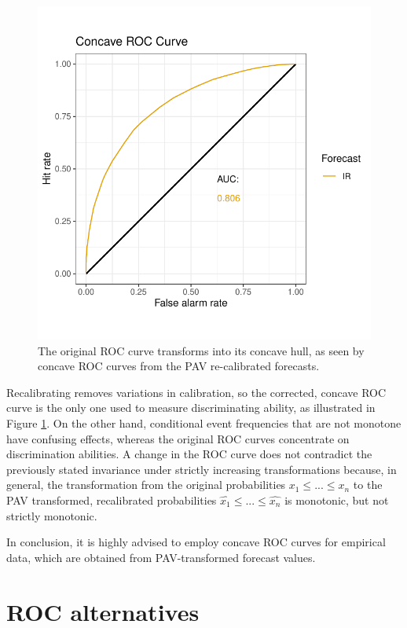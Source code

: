 \documentclass[a4paper,12pt]{article}
\numberwithin{equation}{section}
\begin{document}
   \begin{figure}[h]
      \centering
      \includegraphics[scale=0.7]{Plots_sim/concave_sim.pdf}
      \caption{The original ROC curve transforms into its concave hull, as seen by concave ROC curves from the PAV re-calibrated forecasts.}
      \label{fig:concave_sim}
  \end{figure}

   Recalibrating removes variations in calibration, so the corrected, concave ROC curve is the only one used to measure discriminating ability, as illustrated in Figure \ref{fig:concave_sim}. On the other hand, conditional event frequencies that are not monotone have confusing effects, whereas the original ROC curves concentrate on discrimination abilities. A change in the ROC curve does not contradict the previously stated invariance under strictly increasing transformations because, in general, the transformation from the original probabilities $x_{1} \leq ... \leq x_{n}$ to the PAV transformed, recalibrated probabilities $\hat{x_{1}} \leq ... \leq \hat{x_{n}}$ is monotonic, but not strictly monotonic. \bigskip

   In conclusion, it is highly advised to employ concave ROC curves for empirical data, which are obtained from PAV-transformed forecast values. 

\section{ROC alternatives}
\end{document}
